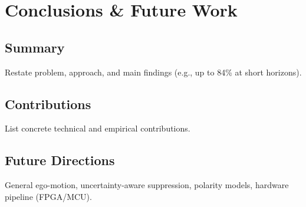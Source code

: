\chapter{Conclusions \& Future Work}\label{chap:conclusion}

\section{Summary}
Restate problem, approach, and main findings (e.g., up to 84\% at short horizons).

\section{Contributions}
List concrete technical and empirical contributions.

\section{Future Directions}
General ego-motion, uncertainty-aware suppression, polarity models, hardware pipeline (FPGA/MCU).
